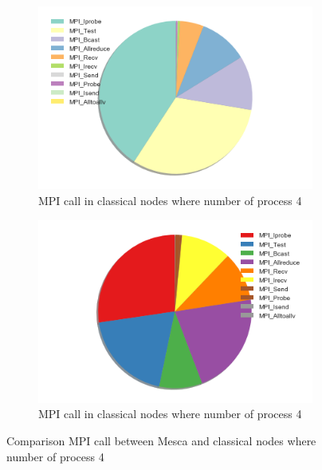 \begin{figure}[!h]
\centering 
  \begin{subfigure}[b]{0.7\textwidth}
    \includegraphics[width=\textwidth]{images/PieInca4process.png}
    \caption{MPI call in classical nodes where number of process 4}
    \label{MPIProfInca}
  \end{subfigure}
  \begin{subfigure}[b]{0.7\textwidth}
    \includegraphics[width=\textwidth]{images/PieMesca4process.png}
    \caption{MPI call in classical nodes where number of process 4}
    \label{MPIProfMesc}
  \end{subfigure}
  \caption{Comparison MPI call between Mesca and classical nodes where number of process 4}
\end{figure}

